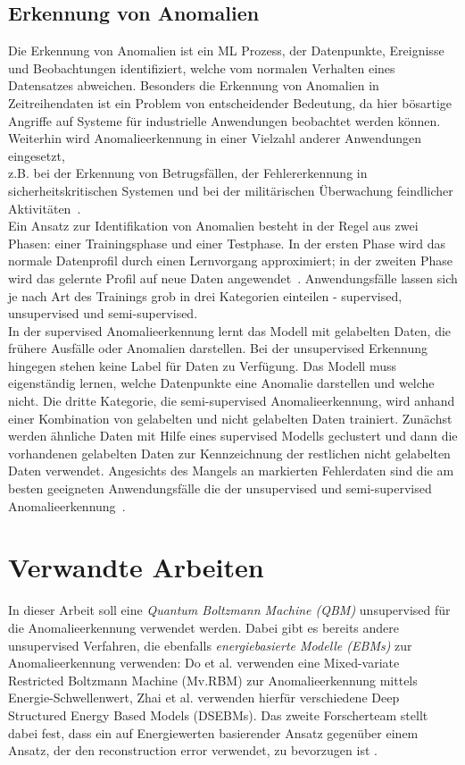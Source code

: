 \subsection{Erkennung von Anomalien}
\label{subsec:basics-ad}
Die Erkennung von Anomalien ist ein ML Prozess, der Datenpunkte, Ereignisse und Beobachtungen identifiziert, welche vom normalen Verhalten eines Datensatzes abweichen. Besonders die Erkennung von Anomalien in Zeitreihendaten ist ein Problem von entscheidender Bedeutung, da hier bösartige Angriffe auf Systeme für industrielle Anwendungen beobachtet werden können. Weiterhin wird Anomalieerkennung in einer Vielzahl anderer Anwendungen eingesetzt, \\z.B. bei der Erkennung von Betrugsfällen, der Fehlererkennung in sicherheitskritischen Systemen und bei der militärischen Überwachung feindlicher Aktivitäten~\cite{chandola2009anomaly}.\\
Ein Ansatz zur Identifikation von Anomalien besteht in der Regel aus zwei Phasen: einer Trainingsphase und einer Testphase. In der ersten Phase wird das normale Datenprofil durch einen Lernvorgang approximiert; in der zweiten Phase wird das gelernte Profil auf neue Daten angewendet~\cite{patcha2007overview}. Anwendungsfälle lassen sich je nach Art des Trainings grob in drei Kategorien einteilen - supervised, unsupervised und semi-supervised.\\ 
In der supervised Anomalieerkennung lernt das Modell mit gelabelten Daten, die frühere Ausfälle oder Anomalien darstellen. Bei der unsupervised Erkennung hingegen stehen keine Label für Daten zu Verfügung. Das Modell muss eigenständig lernen, welche Datenpunkte eine Anomalie darstellen und welche nicht. Die dritte Kategorie, die semi-supervised Anomalieerkennung, wird anhand einer Kombination von gelabelten und nicht gelabelten Daten trainiert. Zunächst werden ähnliche Daten mit Hilfe eines supervised Modells geclustert und dann die vorhandenen gelabelten Daten zur Kennzeichnung der restlichen nicht gelabelten Daten verwendet. Angesichts des Mangels an markierten Fehlerdaten sind die am besten geeigneten Anwendungsfälle die der unsupervised und semi-supervised Anomalieerkennung~\cite{chandola2009anomaly}.



\section{Verwandte Arbeiten}
\label{sec:related}
In dieser Arbeit soll eine \emph{Quantum Boltzmann Machine (QBM)} unsupervised für die Anomalieerkennung verwendet werden.
Dabei gibt es bereits andere unsupervised Verfahren, die ebenfalls \emph{energiebasierte Modelle (EBMs)} zur Anomalieerkennung verwenden: Do et al. \cite{do2018energy} verwenden eine Mixed-variate Restricted Boltzmann Machine (Mv.RBM) zur Anomalieerkennung mittels Energie-Schwellenwert, Zhai et al. \cite{zhai2016deep} verwenden hierfür verschiedene Deep Structured Energy Based Models (DSEBMs). Das zweite Forscherteam stellt dabei fest, dass ein auf Energiewerten basierender Ansatz gegenüber einem Ansatz, der den reconstruction error verwendet, zu bevorzugen ist \cite{zhai2016deep}.

